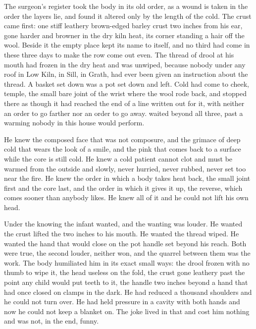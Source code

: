 The surgeon's register took the body in its old order, as a wound is taken in the order the layers lie, and found it altered only by the length of the cold. The crust came first: one stiff leathery brown-edged barley crust two inches from his ear, gone harder and browner in the dry kiln heat, its corner standing a hair off the wool. Beside it the empty place kept its name to itself, and no third had come in these three days to make the row come out even. The thread of drool at his mouth had frozen in the dry heat and was unwiped, because nobody under any roof in Low Kiln, in Sill, in Grath, had ever been given an instruction about the thread. A basket set down was a pot set down and left. Cold had come to cheek, temple, the small bare joint of the wrist where the wool rode back, and stopped there as though it had reached the end of a line written out for it, with neither an order to go farther nor an order to go away.  waited beyond all three, past a warming nobody in this house would perform.

He knew the composed face that was not composure, and the grimace of deep cold that wears the look of a smile, and the pink that comes back to a surface while the core is still cold. He knew a cold patient cannot clot and must be warmed from the outside and slowly, never hurried, never rubbed, never set too near the fire. He knew the order in which a body takes heat back, the small joint first and the core last, and the order in which it gives it up, the reverse, which comes sooner than anybody likes. He knew all of it and he could not lift his own head.

Under the knowing the infant wanted, and the wanting was louder. He wanted the crust lifted the two inches to his mouth. He wanted the thread wiped. He wanted the hand that would close on the pot handle set beyond his reach. Both were true, the second louder, neither won, and the quarrel between them was the work. The body humiliated him in its exact small ways: the drool frozen with no thumb to wipe it, the head useless on the fold, the crust gone leathery past the point any child would put teeth to it, the handle two inches beyond a hand that had once closed on clamps in the dark. He had reduced a thousand shoulders and he could not turn over. He had held pressure in a cavity with both hands and now he could not keep a blanket on. The joke lived in that and cost him nothing and was not, in the end, funny.

\scenebreak

